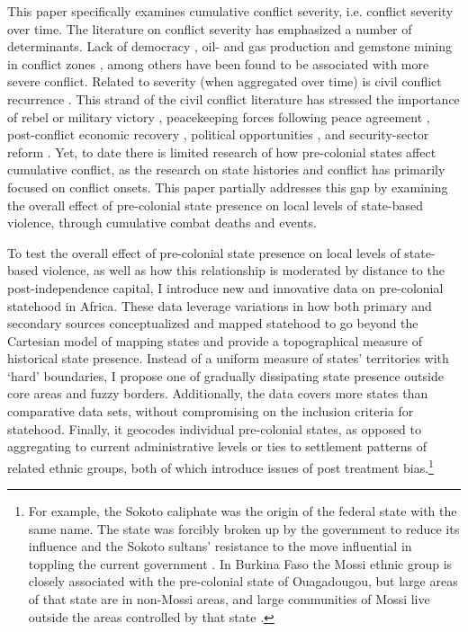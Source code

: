 \documentclass[12pt]{article}
\begin{document}
This paper specifically examines cumulative conflict severity, i.e. conflict
severity over time. The literature on conflict severity has emphasized a number
of determinants. Lack of democracy \citep{Lacina_2006}, oil- and gas production
and gemstone mining in conflict zones \citep{Lujala_2008}, among others have
been found to be associated with more severe conflict. Related to severity (when
aggregated over time) is civil conflict recurrence \citep{Collier2003b}. This
strand of the civil conflict literature has stressed the importance of rebel or
military victory \citep{Luttwak_1999, Quinn2007, Toft_2010}, peacekeeping forces
following peace agreement \citep{Collier_2008, Quinn2007}, post-conflict
economic recovery \citep{Collier_2008, Quinn2007}, political opportunities
\citep{Walter_2004}, and security-sector reform \citep{Toft_2009}. Yet, to date
there is limited research of how pre-colonial states affect cumulative conflict,
as the research on state histories and conflict has primarily focused on
conflict onsets. This paper partially addresses this gap by examining the
overall effect of pre-colonial state presence on local levels of state-based
violence, through cumulative combat deaths and events. 

To test the overall effect of pre-colonial state presence on local levels of
state-based violence, as well as how this relationship is moderated by distance
to the post-independence capital, I introduce new and innovative data on
pre-colonial statehood in Africa. These data leverage variations in how both
primary and secondary sources conceptualized and mapped statehood to go beyond
the Cartesian model of mapping states and provide a topographical measure of
historical state presence. Instead of a uniform measure of states' territories
with `hard' boundaries, I propose one of gradually dissipating state presence
outside core areas and fuzzy borders. Additionally, the data covers more states
than comparative data sets, without compromising on the inclusion criteria for
statehood. Finally, it geocodes individual pre-colonial states, as opposed to
aggregating to current administrative levels or ties to settlement patterns of
related ethnic groups, both of which introduce issues of post treatment
bias.\footnote{For example, the Sokoto caliphate was the origin of the federal
state with the same name. The state was forcibly broken up by the government to
reduce its influence and the Sokoto sultans' resistance to the move influential
in toppling the current government \citep{HiribarrenVincent2017AHoB}. In Burkina
Faso the Mossi ethnic group is closely associated with the pre-colonial state of
Ouagadougou, but large areas of that state are in non-Mossi areas, and large
communities of Mossi live outside the areas controlled by that state
\citep{Wishman2021a}.}
\end{document}
